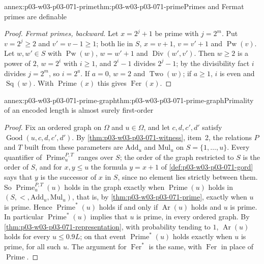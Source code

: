 \begin{annexitem}{annex:p03-w03-p03-071-prime}{thm:p03-w03-p03-071-prime}{Primes and Fermat primes are definable}
\begin{proof}
\emph{Fermat primes, backward.}  Let \(x=2^{j}+1\) be prime with
\(j=2^m\).  Put \(v=2^j\geq2\) and \(v'=v-1\geq1\); both lie in \(S\),
\(x=v+1\), \(v=v'+1\) and \(\operatorname{Pw}(v)\).  Let \(w,w'\in S\) with
\(\operatorname{Pw}(w)\), \(w=w'+1\) and \(\operatorname{Div}(w',v')\).
Then \(w\geq2\) is a power of \(2\), \(w=2^i\) with \(i\geq1\), and
\(2^i-1\) divides \(2^j-1\); by the divisibility fact \(i\) divides
\(j=2^m\), so \(i=2^a\).  If \(a=0\), \(w=2\) and \(\operatorname{Two}(w)\);
if \(a\geq1\), \(i\) is even and \(\operatorname{Sq}(w)\).  With
\(\operatorname{Prime}(x)\) this gives \(\operatorname{Fer}(x)\).
\end{proof}
\end{annexitem}

\begin{annexitem}{annex:p03-w03-p03-071-prime-graph}{thm:p03-w03-p03-071-prime-graph}{Primality of an encoded length is almost surely first-order}
\begin{proof}
Fix an ordered graph on \(\Omega\) and \(u\in\Omega\), and let
\(c,d,c',d'\) satisfy \(\operatorname{Good}(u,c,d,c',d')\).  By
\cref{thm:p03-w03-p03-071-witness}, item~2, the relations \(P\) and \(T\)
built from these parameters are \(\mathrm{Add}_u\) and \(\mathrm{Mul}_u\) on
\(S=\{1,\ldots,u\}\).  Every quantifier of \(\operatorname{Prime}^{P,T}_u\)
ranges over \(S\); the order of the graph restricted to \(S\) is the order of
\(S\), and for \(x,y\leq u\) the formula \(y=x+1\) of
\cref{def:p03-w03-p03-071-gord} says that \(y\) is the successor of \(x\) in
\(S\), since no element lies strictly between them.  So
\(\operatorname{Prime}^{P,T}_u(u)\) holds in the graph exactly when
\(\operatorname{Prime}(u)\) holds in \((S,<,\mathrm{Add}_u,\mathrm{Mul}_u)\),
that is, by \cref{thm:p03-w03-p03-071-prime}, exactly when \(u\) is prime.
Hence \(\operatorname{Prime}^{\ast}(u)\) holds if and only if
\(\operatorname{Ar}(u)\) holds and \(u\) is prime.  In particular
\(\operatorname{Prime}^{\ast}(u)\) implies that \(u\) is prime, in every
ordered graph.  By \cref{thm:p03-w03-p03-071-representation}, with
probability tending to \(1\), \(\operatorname{Ar}(u)\) holds for every
\(u\leq0.9L\); on that event \(\operatorname{Prime}^{\ast}(u)\) holds exactly
when \(u\) is prime, for all such \(u\).  The argument for
\(\operatorname{Fer}^{\ast}\) is the same, with \(\operatorname{Fer}\) in
place of \(\operatorname{Prime}\).
\end{proof}
\end{annexitem}

